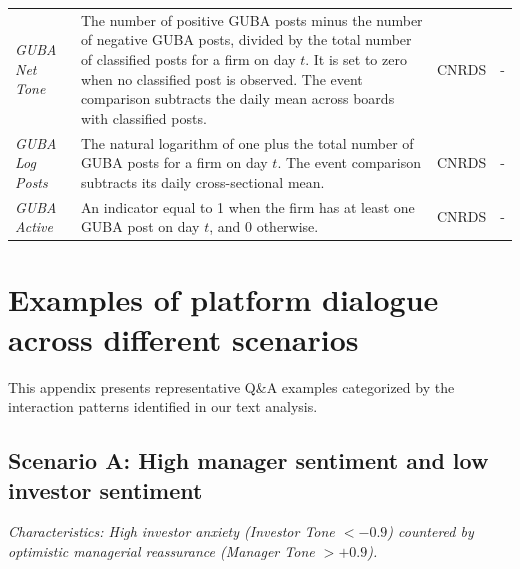 \documentclass[12pt]{article}
\begin{document}
\begin{xltabular}{\textwidth}{@{} >{\RaggedRight\arraybackslash}p{3.1cm} >{\RaggedRight\arraybackslash}X >{\RaggedRight\arraybackslash}p{2.6cm} >{\RaggedRight\arraybackslash}p{2.8cm} @{}}
   \\
  \midrule
  \textit{GUBA Net Tone} & The number of positive GUBA posts minus the number of negative GUBA posts, divided by the total number of classified posts for a firm on day $t$. It is set to zero when no classified post is observed. The event comparison subtracts the daily mean across boards with classified posts. & CNRDS & - \\
  \addlinespace
  \textit{GUBA Log Posts} & The natural logarithm of one plus the total number of GUBA posts for a firm on day $t$. The event comparison subtracts its daily cross-sectional mean. & CNRDS & - \\
  \addlinespace
  \textit{GUBA Active} & An indicator equal to 1 when the firm has at least one GUBA post on day $t$, and 0 otherwise. & CNRDS & - \\
\end{xltabular}
\endgroup

\clearpage


\section{Examples of platform dialogue across different scenarios} \label{app:cases}

This appendix presents representative Q\&A examples categorized by the interaction patterns identified in our text analysis. 

\subsection{Scenario A: High manager sentiment and low investor sentiment}
\textit{Characteristics: High investor anxiety (Investor Tone $< -0.9$) countered by optimistic managerial reassurance (Manager Tone $> +0.9$).}
\vspace{0.3cm}
\end{document}
